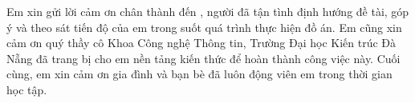 \begin{acknowledgments}

\begin{chuy}
\end{chuy}

\begin{mau}
Em xin gửi lời cảm ơn chân thành đến \dauGVHD, người đã tận tình định hướng
đề tài, góp ý và theo sát tiến độ của em trong suốt quá trình thực hiện đồ
án. Em cũng xin cảm ơn quý thầy cô Khoa Công nghệ Thông tin, Trường Đại học
Kiến trúc Đà Nẵng đã trang bị cho em nền tảng kiến thức để hoàn thành công
việc này. Cuối cùng, em xin cảm ơn gia đình và bạn bè đã luôn động viên em
trong thời gian học tập.
\end{mau}

\vspace{1.4em}
\hfill{}

\end{acknowledgments}
